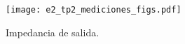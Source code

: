\documentclass[12pt]{article}
\begin{document}
\begin{figure}
	\texttt{[image: e2\_tp2\_mediciones\_figs.pdf]}
	\caption{Impedancia de salida.}
\end{figure}
\end{document}
